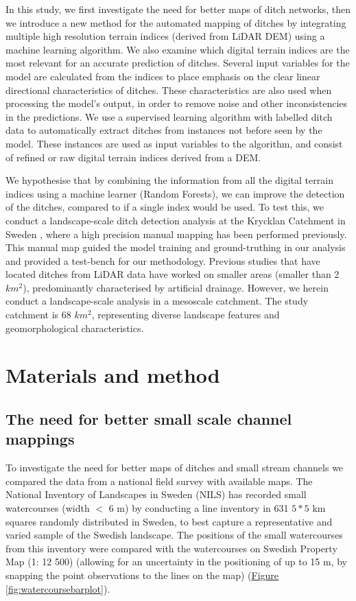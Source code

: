 \documentclass[]{interact}
\theoremstyle{plain}%
\theoremstyle{definition}
\theoremstyle{remark}
\begin{document}
In this study, we first investigate the need for better maps of ditch networks, then we introduce a new method for the automated mapping of ditches by integrating multiple high resolution terrain indices (derived from LiDAR DEM) using a machine learning algorithm. We also examine which digital terrain indices are the most relevant for an accurate prediction of ditches. Several input variables for the model are calculated from the indices to place emphasis on the clear linear directional characteristics of ditches. These characteristics are also used when processing the model's output, in order to remove noise and other inconsistencies in the predictions. We use a supervised learning algorithm with labelled ditch data to automatically extract ditches from instances not before seen by the model. These instances are used as input variables to the algorithm, and consist of refined or raw digital terrain indices derived from a DEM.

We hypothesise that by combining the information from all the digital terrain indices using a machine learner (Random Forests), we can improve the detection of the ditches, compared to if a single index would be used. To test this, we conduct a landscape-scale ditch detection analysis at the Krycklan Catchment in Sweden \citep{krycklancatchment}, where a high precision manual mapping has been performed previously. This manual map guided the model training and ground-truthing in our analysis and provided a test-bench for our methodology. Previous studies \citep{roelens, bailly, rapinel, kiss} that have located ditches from LiDAR data have worked on smaller areas (smaller than 2 $km^2$), predominantly characterised by artificial drainage. However, we herein conduct a landscape-scale analysis in a mesoscale catchment. The study  catchment  is 68 $km^2$, representing diverse landscape features and geomorphological characteristics.

\section{Materials and method}
\label{method}

\subsection{The need for better small scale channel mappings}
To investigate the need for better maps of ditches and small stream channels we compared the data from a national field survey with available maps. The National Inventory of Landscapes in Sweden (NILS) has recorded small watercourses (width $<$ 6 m) by conducting a line inventory in 631 $5*5$ km squares randomly distributed in Sweden, to best capture a representative and varied sample of the Swedish landscape. The positions of the small watercourses from this inventory were compared with the watercourses on Swedish Property Map (1: 12 500) (allowing for an uncertainty in the positioning of up to 15 m, by snapping the point observations to the lines on the map) (\hyperref[fig:watercoursebarplot]{Figure} \ref{fig:watercoursebarplot}).
\end{document}
